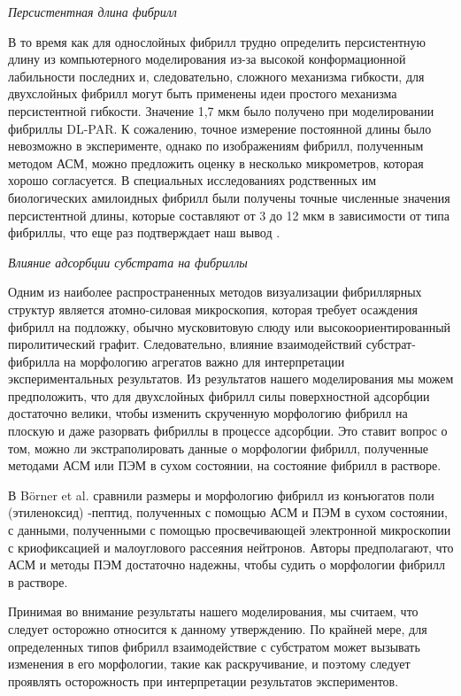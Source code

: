     \emph{Персистентная длина фибрилл}
    
    В то время как для однослойных фибрилл трудно определить персистентную длину из компьютерного моделирования из-за высокой конформационной лабильности последних и, следовательно, сложного механизма гибкости, для двухслойных фибрилл могут быть применены идеи простого механизма персистентной гибкости. Значение 1,7 мкм было получено при моделировании фибриллы DL-PAR. К сожалению, точное измерение постоянной длины было невозможно в эксперименте, однако по изображениям фибрилл, полученным методом АСМ, можно предложить оценку в несколько микрометров, которая хорошо согласуется. В специальных исследованиях родственных им биологических амилоидных фибрилл были получены точные численные значения персистентной длины, которые составляют от 3 до 12 мкм в зависимости от типа фибриллы, что еще раз подтверждает наш вывод \cite{knowles_spatial_2006}.
    
    \emph{Влияние адсорбции субстрата на фибриллы}
    
    Одним из наиболее распространенных методов визуализации фибриллярных структур является атомно-силовая микроскопия, которая требует осаждения фибрилл на подложку, обычно мусковитовую слюду или высокоориентированный пиролитический графит. Следовательно, влияние взаимодействий субстрат-фибрилла на морфологию агрегатов важно для интерпретации экспериментальных результатов. Из результатов нашего моделирования мы можем предположить, что для двухслойных фибрилл силы поверхностной адсорбции достаточно велики, чтобы изменить скрученную морфологию фибрилл на плоскую и даже разорвать фибриллы в процессе адсорбции. Это ставит вопрос о том, можно ли экстраполировать данные о морфологии фибрилл, полученные методами АСМ или ПЭМ в сухом состоянии, на состояние фибрилл в растворе.
    
    В Börner et al. \cite{borner_organization_2008} сравнили размеры и морфологию фибрилл из конъюгатов поли (этиленоксид) -пептид, полученных с помощью АСМ и ПЭМ в сухом состоянии, с данными, полученными с помощью просвечивающей электронной микроскопии с криофиксацией и малоуглового рассеяния нейтронов. Авторы предполагают, что АСМ и методы ПЭМ достаточно надежны, чтобы судить о морфологии фибрилл в растворе.

    Принимая во внимание результаты нашего моделирования, мы считаем, что следует осторожно относится к данному утверждению. По крайней мере, для определенных типов фибрилл взаимодействие с субстратом может вызывать изменения в его морфологии, такие как раскручивание, и поэтому следует проявлять осторожность при интерпретации результатов экспериментов.

